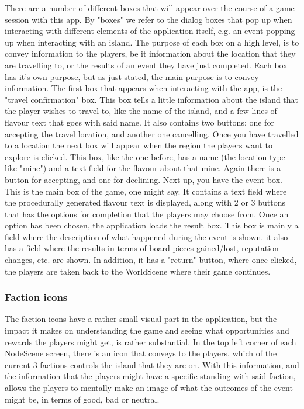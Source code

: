 There are a number of different boxes that will appear over the course of a game session with this app. By "boxes" we refer to the dialog boxes that pop up when interacting with different elements of the application itself, e.g. an event popping up when interacting with an island.
The purpose of each box on a high level, is to convey information to the players, be it information about the location that they are travelling to, or the results of an event they have just completed.
Each box has it's own purpose, but as just stated, the main purpose is to convey information. The first box that appears when interacting with the app, is the "travel confirmation" box. This box tells a little information about the island that the player wishes to travel to, like the name of the island, and a few lines of flavour text that goes with said name. It also contains two buttons; one for accepting the travel location, and another one cancelling.
Once you have travelled to a location the next box will appear when the region the players want to explore is clicked. This box, like the one before, has a name (the location type like "mine") and a text field for the flavour about that mine. Again there is a button for accepting, and one for declining. 
Next up, you have the event box. This is the main box of the game, one might say. It contains a text field where the procedurally generated flavour text is displayed, along with 2 or 3 buttons that has the options for completion that the players may choose from. 
Once an option has been chosen, the application loads the result box. This box is mainly a field where the description of what happened during the event is shown. it also has a field where the results in terms of board pieces gained/lost, reputation changes, etc. are shown. In addition, it has a "return" button, where once clicked, the players are taken back to the WorldScene where their game continues.


\subsubsection{Faction icons}

The faction icons have a rather small visual part in the application, but the impact it makes on understanding the game and seeing what opportunities and rewards the players might get, is rather substantial. In the top left corner of each NodeScene screen, there is an icon that conveys to the players, which of the current 3 factions controls the island that they are on. With this information, and the information that the players might have a specific standing with said faction, allows the players to mentally make an image of what the outcomes of the event might be, in terms of good, bad or neutral.

